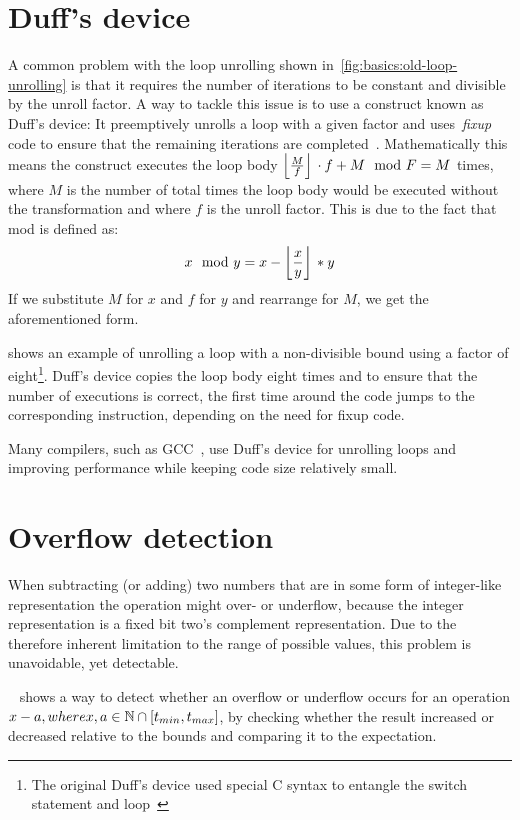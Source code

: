 

\section{Duff's device}\label{sec:basics:duffs}

A common problem with the loop unrolling shown in~\cref{fig:basics:old-loop-unrolling} is that it requires the number of iterations to be constant and divisible by the unroll factor.
A way to tackle this issue is to use a construct known as Duff's device: It preemptively unrolls a loop with a given factor and uses~\textit{fixup} code to ensure that the remaining iterations are completed~\cite{duff_1983}.
Mathematically this means the construct executes the loop body $\left\lfloor{}\frac{M}{f}\right\rfloor{} \cdot f + M \mod F = M$ times, where $M$ is the number of total times the loop body would be executed without the transformation and where $f$ is the unroll factor.
This is due to the fact that mod is defined as:
$$x \mod{} y = x - \left\lfloor{}\frac{x}{y}\right\rfloor{} * y$$
If we substitute $M$ for $x$ and $f$ for $y$ and rearrange for $M$, we get the aforementioned form.

 shows an example of unrolling a loop with a non-divisible bound using a factor of eight\footnote{The original Duff's device used special C syntax to entangle the switch statement and loop~\cite{duff_1983}}.
Duff's device copies the loop body eight times and to ensure that the number of executions is correct, the first time around the code jumps to the corresponding instruction, depending on the need for fixup code.

Many compilers, such as GCC~\cite{gcc}, use Duff's device for unrolling loops and improving performance while keeping code size relatively small.



\newpage

\section{Overflow detection}\label{sec:basics:overflow}

When subtracting (or adding) two numbers that are in some form of integer-like representation the operation might over- or underflow, because the integer representation is a fixed bit two's complement representation.
Due to the therefore inherent limitation to the range of possible values, this problem is unavoidable, yet detectable.

~\cite{pmg_2009} shows a way to detect whether an overflow or underflow occurs for an operation $x - a, where x, a \in \mathbb{N} \cap {\lbrack t_{min}, t_{max} \rbrack}$, by checking whether the result increased or decreased relative to the bounds and comparing it to the expectation.


